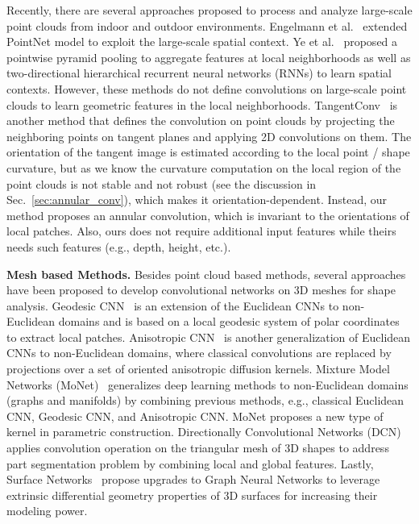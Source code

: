 \documentclass[10pt,twocolumn,letterpaper]{article}
\begin{document}
Recently, there are several approaches proposed to process and analyze large-scale point clouds from indoor and outdoor environments. Engelmann et al.~\cite{engelmann2017exploring} extended PointNet model to exploit the large-scale spatial context. Ye et al.~\cite{Ye_2018_ECCV} proposed a pointwise pyramid pooling to aggregate features at local neighborhoods as well as two-directional hierarchical recurrent neural networks (RNNs) to learn spatial contexts. However, these methods do not define convolutions on large-scale point clouds to learn geometric features in the local neighborhoods.
TangentConv~\cite{tatarchenko2018tangent} is another method that defines the convolution on point clouds by projecting the neighboring points on tangent planes and applying 2D convolutions on them. The orientation of the tangent image is estimated according to the local point / shape curvature, but as we know the curvature computation on the local region of the point clouds is not stable and not robust (see the discussion in Sec.~\ref{sec:annular_conv}), which makes it orientation-dependent. Instead, our method proposes an annular convolution, which is invariant to the orientations of local patches.
Also, ours does not require additional input features while theirs needs such features (e.g., depth, height, etc.).


\textbf{Mesh based Methods.} Besides point cloud based methods, several approaches have been proposed to develop convolutional networks on 3D meshes for shape analysis. Geodesic CNN~\cite{masci2015geodesic} is an extension of the Euclidean CNNs to non-Euclidean domains and is based on a local geodesic system of polar coordinates to extract local patches. Anisotropic CNN~\cite{boscaini2016learning} is another generalization of Euclidean CNNs to non-Euclidean domains, where classical convolutions are replaced by projections over a set of oriented anisotropic diffusion kernels. Mixture Model Networks (MoNet)~\cite{monti2017geometric} generalizes deep learning methods to non-Euclidean domains (graphs and manifolds) by combining previous methods, e.g., classical Euclidean CNN, Geodesic CNN, and Anisotropic CNN. MoNet proposes a new type of kernel in parametric construction. Directionally Convolutional Networks (DCN)~\cite{Xu_2017_ICCV} applies convolution operation on the triangular mesh of 3D shapes to address part segmentation problem by combining local and global features. Lastly, Surface Networks~\cite{Kostrikov-cvpr18} propose upgrades to Graph Neural Networks to leverage extrinsic differential geometry properties of 3D surfaces for increasing their modeling power.
\end{document}
